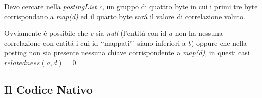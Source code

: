 Devo cercare nella \textit{postingList c}, un gruppo di quattro byte in cui i primi tre byte corrispondano a \textit{map(d)} ed il quarto byte sar\'a il valore di correlazione voluto. 

Ovviamente \'e possibile che \textit{c} sia \textit{null} (l'entit\'a con id \textit{a} non ha nessuna correlazione con entit\'a i cui id \lq\lq mappati\rq\rq\ siano inferiori a \textit{b}) oppure 
che nella posting non sia presente nessuna chiave corrispondente a \textit{map(d)}, in questi casi $relatedness(a,d) = 0$. 

\subsection{Il Codice Nativo}

